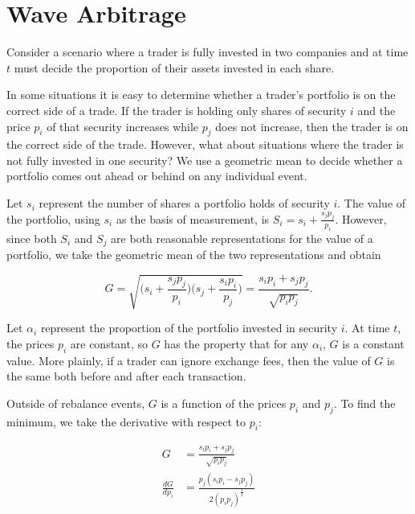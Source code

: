 \documentclass{article}
\begin{document}
\section{Wave Arbitrage}

Consider a scenario where a trader is fully invested in two companies and at
time $t$ must decide the proportion of their assets invested in each share.

In some situations it is easy to determine whether a trader’s portfolio is on
the correct side of a trade. If the trader is holding only shares of security
$i$ and the price $p_i$ of that security increases while $p_j$ does not
increase, then the trader is on the correct side of the trade. However, what
about situations where the trader is not fully invested in one security? We use
a geometric mean to decide whether a portfolio comes out ahead or behind on any
individual event.

Let $s_i$ represent the number of shares a portfolio holds of security $i$. The
value of the portfolio, using $s_i$ as the basis of measurement, is
$S_i = s_i + \frac{s_j p_j}{p_i}$. However, since both $S_i$ and $S_j$ are both
reasonable representations for the value of a portfolio, we take the geometric
mean of the two representations and obtain

\begin{equation}
\label{eq:g_def}
  G = \sqrt{ \bigg( s_i + \frac{s_j p_j}{p_i} \bigg)
             \bigg( s_j + \frac{s_i p_i}{p_j} \bigg)
           }
    = \frac{s_i p_i + s_j p_j}{\sqrt{p_i p_j}}.
\end{equation}

Let $\alpha_i$ represent the proportion of the portfolio invested in security
$i$. At time $t$, the prices $p_i$ are constant, so $G$ has the property that
for any $\alpha_i$, $G$ is a constant value. More plainly, if a trader can
ignore exchange fees, then the value of $G$ is the same both before and after
each transaction.

Outside of rebalance events, $G$ is a function of the prices $p_i$ and $p_j$.
To find the minimum, we take the derivative with respect to $p_i$:

\begin{equation}
\begin{aligned}
  G &= \frac{s_i p_i + s_j p_j}{\sqrt{p_i p_j}} \\
  \frac{dG}{dp_i} &= \frac{p_j (s_i p_i - s_j p_j)}{2 (p_i p_j)^{\frac{3}{2}}} \\
\end{aligned}
\end{equation}
\end{document}
